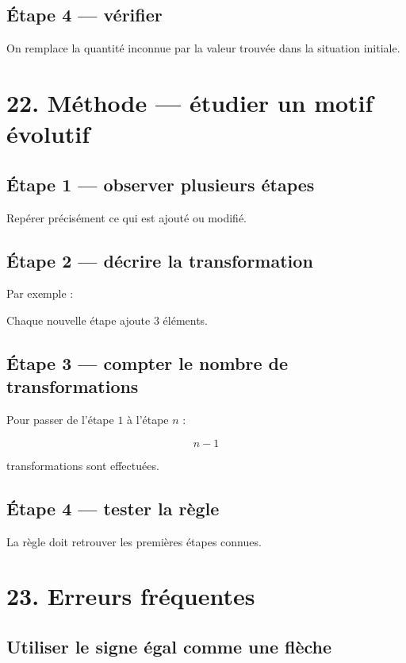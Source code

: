 \subsection{Étape 4 — vérifier}

On remplace la quantité inconnue par la valeur trouvée dans la situation initiale.

\section{22. Méthode — étudier un motif évolutif}

\subsection{Étape 1 — observer plusieurs étapes}

Repérer précisément ce qui est ajouté ou modifié.

\subsection{Étape 2 — décrire la transformation}

Par exemple :

\begin{remarque}
Chaque nouvelle étape ajoute $3$ éléments.
\end{remarque}

\subsection{Étape 3 — compter le nombre de transformations}

Pour passer de l’étape $1$ à l’étape $n$ :

\[
n-1
\]

transformations sont effectuées.

\subsection{Étape 4 — tester la règle}

La règle doit retrouver les premières étapes connues.

\section{23. Erreurs fréquentes}

\subsection{Utiliser le signe égal comme une flèche}

